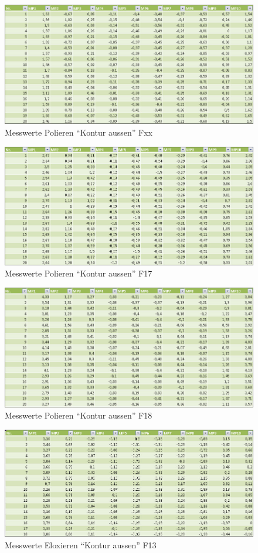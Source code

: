 \documentclass[12pt,a4paper,parskip]{scrartcl}
\begin{document}
\begin{figure}[hbtp]
\centering
\includegraphics[width=1\textwidth]{Fxxpolier.jpg}
\caption{Messwerte Polieren "`Kontur aussen"' Fxx}
\end{figure}
\begin{figure}[hbtp]
\centering
\includegraphics[width=1\textwidth]{F17polier.jpg}
\caption{Messwerte Polieren "`Kontur aussen"' F17}
\end{figure}
\begin{figure}[hbtp]
\centering
\includegraphics[width=1\textwidth]{F18polier.jpg}
\caption{Messwerte Polieren "`Kontur aussen"' F18}
\end{figure}
\begin{figure}[hbtp]
\centering
\includegraphics[width=1\textwidth]{F13elox.jpg}
\caption{Messwerte Eloxieren "`Kontur aussen"' F13}
\end{figure}
\end{document}
